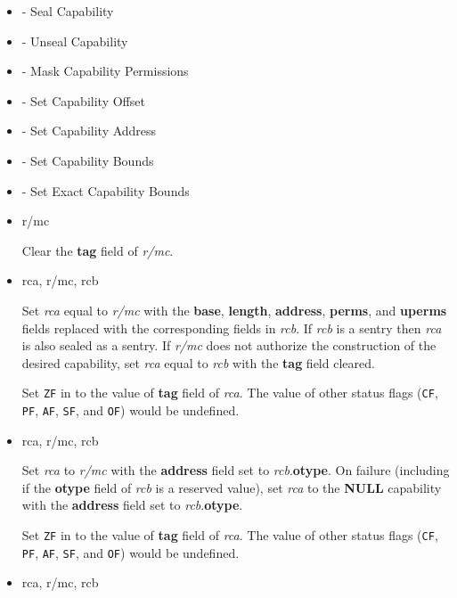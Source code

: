 \begin{itemize}
  \item {} - Seal Capability
  \item {} - Unseal Capability
  \item {} - Mask Capability Permissions
  \item {} - Set Capability Offset
  \item {} - Set Capability Address
  \item {} - Set Capability Bounds
  \item {} - Set Exact Capability Bounds

  \item {} r/mc

    Clear the \textbf{tag} field of \emph{r/mc}.

  \item {} rca, r/mc, rcb

    Set \emph{rca} equal to \emph{r/mc} with the \textbf{base},
    \textbf{length}, \textbf{address}, \textbf{perms}, and
    \textbf{uperms} fields replaced with the corresponding fields in
    \emph{rcb}.  If \emph{rcb} is a sentry then \emph{rca} is also
    sealed as a sentry.  If \emph{r/mc} does not authorize the
    construction of the desired capability, set \emph{rca} equal to
    \emph{rcb} with the \textbf{tag} field cleared.

    Set \texttt{ZF} in \RFLAGS{} to the value of \textbf{tag} field
    of \emph{rca}.  The value of other status flags (\texttt{CF},
    \texttt{PF}, \texttt{AF}, \texttt{SF}, and \texttt{OF}) would be
    undefined.

  \item {} rca, r/mc, rcb

    Set \emph{rca} to \emph{r/mc} with the \textbf{address} field set
    to \emph{rcb}.\textbf{otype}.  On failure (including if the
    \textbf{otype} field of \emph{rcb} is a reserved value), set
    \emph{rca} to the \textbf{NULL} capability with the
    \textbf{address} field set to \emph{rcb}.\textbf{otype}.

    Set \texttt{ZF} in \RFLAGS{} to the value of \textbf{tag} field
    of \emph{rca}.  The value of other status flags (\texttt{CF},
    \texttt{PF}, \texttt{AF}, \texttt{SF}, and \texttt{OF}) would be
    undefined.

  \item {} rca, r/mc, rcb


\end{itemize}
